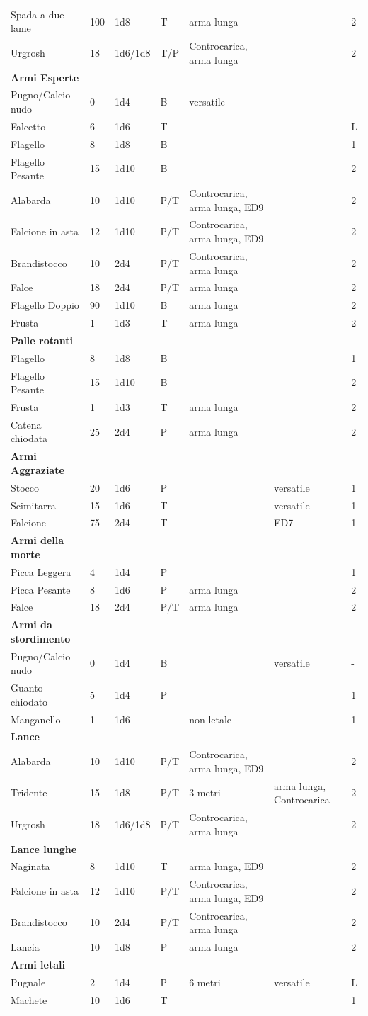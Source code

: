 \documentclass[a4paper,11pt,twoside,openany]{book}
\begin{document}
{\begin{longtable}{|L{3.5cm} |k{1,3cm} |k{1.5cm}| k{1.3cm} |L{3.2cm} |k{2.7cm}|k{2cm}|}
			Spada a due lame & 100 & 1d8 & T & arma lunga & &2\tabularnewline
			Urgrosh & 18 & 1d6/1d8 & T/P & Controcarica, arma lunga & &2\tabularnewline
			\textbf{Armi Esperte} & & & & & &\tabularnewline
			Pugno/Calcio nudo & 0 & 1d4 & B & versatile & &-\tabularnewline
			Falcetto & 6 & 1d6 & T & & &L\tabularnewline
			Flagello & 8 & 1d8 & B & & &1\tabularnewline
			Flagello Pesante & 15 & 1d10 & B & & &2\tabularnewline
			Alabarda & 10 & 1d10 & P/T & Controcarica, arma lunga, ED9 & &2\tabularnewline
			Falcione in asta & 12 & 1d10 & P/T & Controcarica, arma lunga, ED9 & &2\tabularnewline
			Brandistocco & 10 & 2d4 & P/T & Controcarica, arma lunga & &2\tabularnewline
			Falce & 18 & 2d4 & P/T & arma lunga & &2\tabularnewline
			Flagello Doppio & 90 & 1d10 & B & arma lunga & &2\tabularnewline
			Frusta & 1 & 1d3 & T & arma lunga & &2\tabularnewline
			\textbf{Palle rotanti} & & & & & &\tabularnewline
			Flagello & 8 & 1d8 & B & & &1\tabularnewline
			Flagello Pesante & 15 & 1d10 & B & & &2\tabularnewline
			Frusta & 1 & 1d3 & T & arma lunga & &2\tabularnewline
			Catena chiodata & 25 & 2d4 & P & arma lunga & &2\tabularnewline
			\textbf{Armi Aggraziate} & & & & & &\tabularnewline
			Stocco & 20 & 1d6 & P & & versatile&1\tabularnewline
			Scimitarra & 15 & 1d6 & T & & versatile&1\tabularnewline
			Falcione & 75 & 2d4 & T & & ED7&1\tabularnewline
			\textbf{Armi della morte} & & & & & &\tabularnewline
			Picca Leggera & 4 & 1d4 & P & & &1\tabularnewline
			Picca Pesante & 8 & 1d6 & P & arma lunga & &2\tabularnewline
			Falce & 18 & 2d4 & P/T & arma lunga & &2\tabularnewline
			\textbf{Armi da stordimento} & & & & && \tabularnewline
			Pugno/Calcio nudo & 0 & 1d4 & B & & versatile&-\tabularnewline
			Guanto chiodato & 5 & 1d4 & P & & &1\tabularnewline
			Manganello & 1 & 1d6 & & non letale & &1\tabularnewline
			\textbf{Lance} & & & & & &\tabularnewline
			Alabarda & 10 & 1d10 & P/T & Controcarica, arma lunga, ED9 & &2\tabularnewline
			Tridente & 15 & 1d8 & P/T & 3 metri & arma lunga, Controcarica &2\tabularnewline
			Urgrosh & 18 & 1d6/1d8 & P/T & Controcarica, arma lunga & &2\tabularnewline
			\textbf{Lance lunghe} & & & & & &\tabularnewline
			Naginata & 8 & 1d10 & T & arma lunga, ED9 & &2\tabularnewline
			Falcione in asta & 12 & 1d10 & P/T & Controcarica, arma lunga, ED9 & &2\tabularnewline
			Brandistocco & 10 & 2d4 & P/T & Controcarica, arma lunga & &2\tabularnewline
			Lancia & 10 & 1d8 & P & arma lunga & &2\tabularnewline
			\textbf{Armi letali} & & & & & &\tabularnewline
			Pugnale & 2 & 1d4 & P & 6 metri & versatile&L\tabularnewline
			Machete & 10 & 1d6 & T & & &1\tabularnewline

\end{longtable}}
\end{document}
